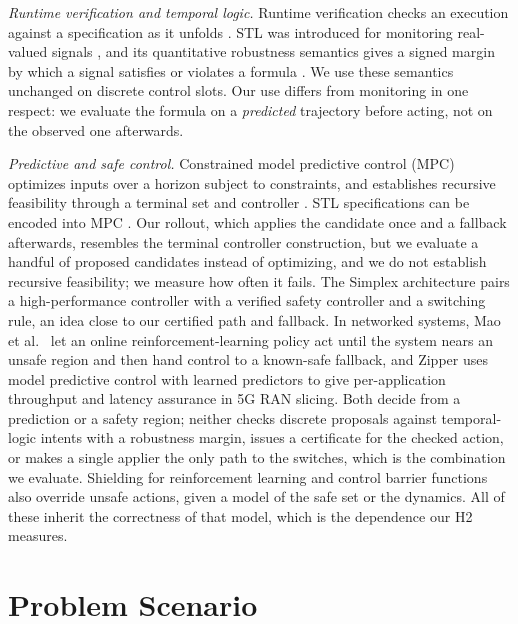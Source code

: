 \documentclass[conference]{IEEEtran}
\begin{document}
\emph{Runtime verification and temporal logic.} Runtime verification checks an
execution against a specification as it unfolds \cite{leucker2009rv}. STL was
introduced for monitoring real-valued signals \cite{maler2004stl}, and its
quantitative robustness semantics gives a signed margin by which a signal satisfies
or violates a formula \cite{fainekos2009robustness,donze2010robust}. We use these
semantics unchanged on discrete control slots. Our use differs from monitoring in one
respect: we evaluate the formula on a \emph{predicted} trajectory before acting,
not on the observed one afterwards.

\emph{Predictive and safe control.} Constrained model predictive control (MPC)
optimizes inputs over a horizon subject to constraints, and establishes recursive
feasibility through a terminal set and controller \cite{mayne2000mpc}. STL
specifications can be encoded into MPC \cite{raman2014stlmpc}. Our rollout,
which applies the candidate once and a fallback afterwards, resembles the terminal
controller construction, but we evaluate a handful of proposed candidates instead of
optimizing, and we do not establish recursive feasibility; we measure how often it
fails. The Simplex architecture \cite{sha2001simplex} pairs a high-performance
controller with a verified safety controller and a switching rule, an idea close to
our certified path and fallback. In networked systems, Mao et al.\
\cite{mao2019trainingwheels} let an online reinforcement-learning policy act until
the system nears an unsafe region and then hand control to a known-safe fallback, and
Zipper \cite{balasingam2024zipper} uses model predictive control with learned
predictors to give per-application throughput and latency assurance in 5G RAN
slicing. Both decide from a prediction or a safety region; neither checks discrete
proposals against temporal-logic intents with a robustness margin, issues a
certificate for the checked action, or makes a single applier the only path to the
switches, which is the combination we evaluate. Shielding for reinforcement learning
\cite{alshiekh2018shielding,konighofer2025shields,garcia2015saferl} and control barrier functions
\cite{ames2017cbf} also override unsafe actions, given a model of the safe set or
the dynamics. All of these inherit the correctness of that model, which is the
dependence our H2 measures.

\section{Problem Scenario}
\label{sec:scenario}
\end{document}

